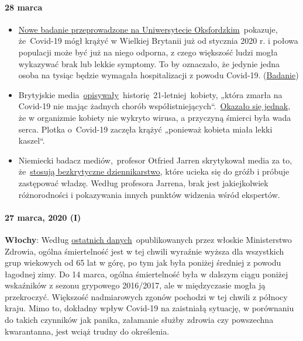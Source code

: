 \hypertarget{28-marca}{%
\paragraph{28 marca}\label{28-marca}}

\begin{itemize}
\tightlist
\item
  \href{https://news.yahoo.com/oxford-study-suggests-millions-people-221100162.html}{Nowe
  badanie przeprowadzone na Uniwersytecie Oksfordzkim}~pokazuje,
  że~Covid-19 mógł krążyć w Wielkiej Brytanii już od stycznia 2020 r. i
  połowa populacji może być już na niego odporna, z czego większość
  ludzi mogła wykazywać brak lub lekkie symptomy. To by oznaczało, że
  jedynie jedna osoba na tysiąc będzie wymagała hospitalizacji z powodu
  Covid-19.
  (\href{https://www.medrxiv.org/content/10.1101/2020.03.24.20042291v1}{Badanie})
\item
  Brytyjskie
  media~\href{https://www.bbc.com/news/uk-england-beds-bucks-herts-52041709}{opisywały}~historię~21-letniej~kobiety,
  „która zmarła na Covid-19 nie mając żadnych chorób
  współistniejących``.~\href{https://archive.is/20200329015127/https://www.theguardian.com/world/2020/mar/27/chloe-middleton-death-21-year-old-not-recorded-nhs-covid-19-related}{Okazało
  się jednak}, że w organizmie kobiety nie wykryto wirusa, a przyczyną
  śmierci była wada serca. Plotka o~Covid-19 zaczęła krążyć „ponieważ
  kobieta miała lekki kaszel``.
\item
  Niemiecki badacz mediów,~profesor Otfried Jarren skrytykował media za
  to,
  że~\href{https://www.deutschlandfunk.de/covid-19-scharfe-kritik-an-ard-und-zdf-wegen.2849.de.html?drn:news_id=1117133}{stosują
  bezkrytyczne dziennikarstwo}, które ucieka się do gróźb i próbuje
  zastępować władzę. Według profesora Jarrena, brak jest jakiejkolwiek
  różnorodności i pokazywania innych punktów widzenia wśród ekspertów.
\end{itemize}

\hypertarget{27-marca-2020-i}{%
\paragraph{27 marca, 2020 (I)}\label{27-marca-2020-i}}

\textbf{Włochy}: Według
\href{http://www.salute.gov.it/portale/caldo/SISMG_sintesi_ULTIMO.pdf}{ostatnich
danych}~opublikowanych przez włoskie Ministerstwo Zdrowia, ogólna
śmiertelność jest w tej chwili wyraźnie wyższa dla wszystkich grup
wiekowych od 65 lat w górę, po tym jak była poniżej średniej z powodu
łagodnej zimy. Do 14 marca, ogólna śmiertelność była w dalszym ciągu
poniżej wskaźników z sezonu grypowego 2016/2017, ale w międzyczasie
mogła ją przekroczyć. Większość nadmiarowych zgonów pochodzi w tej
chwili z północy kraju. Mimo to, dokładny wpływ Covid-19 na zaistniałą
sytuację, w porównaniu do takich czynników jak panika, załamanie służby
zdrowia czy powszechna kwarantanna, jest wciąż trudny do określenia.

